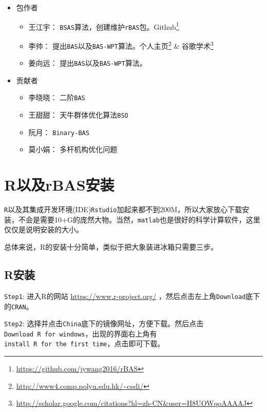 \documentclass[]{ctexbook}
\providecommand{\tightlist}{%
  \setlength{\itemsep}{0pt}\setlength{\parskip}{0pt}}
\renewcommand{\href}[2]{#2\footnote{\url{#1}}}
\theoremstyle{definition}
\theoremstyle{definition}
\theoremstyle{definition}
\theoremstyle{remark}
\begin{document}
\begin{itemize}
\tightlist
\item
  包作者

  \begin{itemize}
  \tightlist
  \item
    王江宇：
    \texttt{BSAS}算法，创建维护\texttt{rBAS}包。\href{https://github.com/jywang2016/rBAS}{Github}
  \item
    李帅：
    提出\texttt{BAS}以及\texttt{BAS-WPT}算法。\href{http://www4.comp.polyu.edu.hk/~cssli/}{个人主页}
    \&
    \href{http://scholar.google.com/citations?hl=zh-CN\&user=H8UOWqoAAAAJ}{谷歌学术}
  \item
    姜向远： 提出\texttt{BAS}以及\texttt{BAS-WPT}算法。
  \end{itemize}
\item
  贡献者

  \begin{itemize}
  \tightlist
  \item
    李晓晓： 二阶\texttt{BAS}
  \item
    王甜甜： 天牛群体优化算法\texttt{BSO}
  \item
    阮月： \texttt{Binary-BAS}
  \item
    莫小娟： 多杆机构优化问题
  \end{itemize}
\end{itemize}

\chapter{R以及rBAS安装}\label{install}

\texttt{R}以及其集成开发环境(IDE)\texttt{Rstudio}加起来都不到200M，所以大家放心下载安装，不会是需要10+G的庞然大物。当然，\texttt{matlab}也是很好的科学计算软件，这里仅仅是说明安装的大小。

总体来说，R的安装十分简单，类似于把大象装进冰箱只需要三步。

\section{R安装}\label{Rinstall}

\texttt{Step1}: 进入R的网站 \url{https://www.r-project.org/}
，然后点击左上角\texttt{Download}底下的\texttt{CRAN}。

\texttt{Step2}:
选择并点击\texttt{China}底下的镜像网址，方便下载。然后点击\texttt{Download\ R\ for\ windows}，出现的界面右上角有\texttt{install\ R\ for\ the\ first\ time}，点击即可下载。
\end{document}
